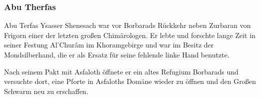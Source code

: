 \subsubsection{Abu Therfas}
Abu Terfas Ysasser Shenesach war vor Borbarads Rückkehr neben Zurbaran von Frigorn einer der letzten großen Chimärologen. Er lebte und forschte lange Zeit in seiner Festung Al'Churâm im Khoramgebirge und war im Besitz der Mondsilberhand, die er als Ersatz für seine fehlende linke Hand benutzte.

Nach seinem Pakt mit Asfaloth öffnete er ein altes Refugium Borbarads und versuchte dort, eine Pforte in Asfaloths Domäne wieder zu öffnen und den Großen Schwarm neu zu erschaffen. 